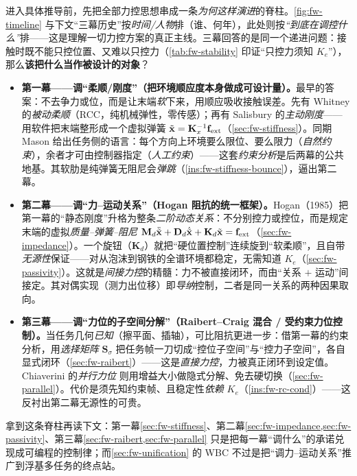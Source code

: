 \begin{insight}
\label{ins:fw-spine}
进入具体推导前，先把全部力控思想串成一条\emph{为何这样演进}的脊柱。\cref{fig:fw-timeline} 与下文“三幕历史”按\emph{时间/人物}排（谁、何年），此处则按\emph{“到底在调控什么”}排——这是理解一切力控方案的真正主线。三幕回答的是同一个递进问题：接触时既不能只控位置、又难以只控力（\cref{tab:fw-stability} 印证“只控力须知 $K_e$”），那么\textbf{该把什么当作被设计的对象}？
\begin{itemize}
  \item \textbf{第一幕——调“柔顺/刚度”（把环境顺应度本身做成可设计量）。}最早的答案：不去争力或位，而是让末端\emph{软}下来，用顺应吸收接触误差。先有 Whitney 的\emph{被动柔顺}（RCC，纯机械弹性，零传感）；再有 Salisbury 的\emph{主动刚度}\cite{salisbury1980active}——用软件把末端整形成一个虚拟弹簧 $\tilde{\mathbf{x}}=\mathbf{K}_x^{-1}\mathbf{f}_{\rm ext}$（\cref{sec:fw-stiffness}）。同期 Mason 给出任务侧的语言：每个方向上环境要么限位、要么限力（\emph{自然约束}），余者才可由控制器指定（\emph{人工约束}）\cite{mason1981compliance}——这套\emph{约束分析}是后两幕的公共地基。其软肋是纯弹簧无阻尼会\emph{弹跳}（\cref{ins:fw-stiffness-bounce}），逼出第二幕。
  \item \textbf{第二幕——调“力--运动关系”（Hogan 阻抗的统一框架）。}Hogan（1985）把第一幕的“静态刚度”升格为整条\emph{二阶动态关系}\cite{hogan1985impedance}：不分别控力或控位，而是规定末端的虚拟\emph{质量--弹簧--阻尼} $\mathbf{M}_d\ddot{\tilde{\mathbf{x}}}+\mathbf{D}_d\dot{\tilde{\mathbf{x}}}+\mathbf{K}_d\tilde{\mathbf{x}}=\mathbf{f}_{\rm ext}$（\cref{sec:fw-impedance}）。一个旋钮（$\mathbf{K}_d$）就把“硬位置控制”连续旋到“软柔顺”，且自带\emph{无源性}保证——对从泡沫到钢铁的全谱环境都稳定，无需知道 $K_e$（\cref{sec:fw-passivity}）。这就是\emph{间接力控}的精髓：力不被直接闭环，而由“关系 $+$ 运动”间接定。其对偶实现（测力出位移）即\emph{导纳}控制，二者是同一关系的两种因果取向。
  \item \textbf{第三幕——调“力位的子空间分解”（Raibert--Craig 混合 / 受约束力位控制）。}当任务几何\emph{已知}（擦平面、插轴），可比阻抗更进一步：借第一幕的约束分析，用\emph{选择矩阵} $\mathbf{S}_\sigma$ 把任务帧一刀切成“控位子空间”与“控力子空间”，各自显式闭环（\cref{sec:fw-raibert}）——这是\emph{直接力控}，力被真正闭环到设定值。Chiaverini 的\emph{并行力位}\cite{chiaverini1993parallel} 则用增益大小做隐式分解、免去硬切换（\cref{sec:fw-parallel}）。代价是须先知约束帧、且稳定性\emph{依赖} $K_e$（\cref{ins:fw-rc-cond}）——这反衬出第二幕无源性的可贵。
\end{itemize}
拿到这条脊柱再读下文：第一幕\cref{sec:fw-stiffness}、第二幕\cref{sec:fw-impedance,sec:fw-passivity}、第三幕\cref{sec:fw-raibert,sec:fw-parallel} 只是把每一幕“调什么”的承诺兑现成可编程的控制律；而\cref{sec:fw-unification} 的 WBC 不过是把“调力--运动关系”推广到浮基多任务的终点站。
\end{insight}


